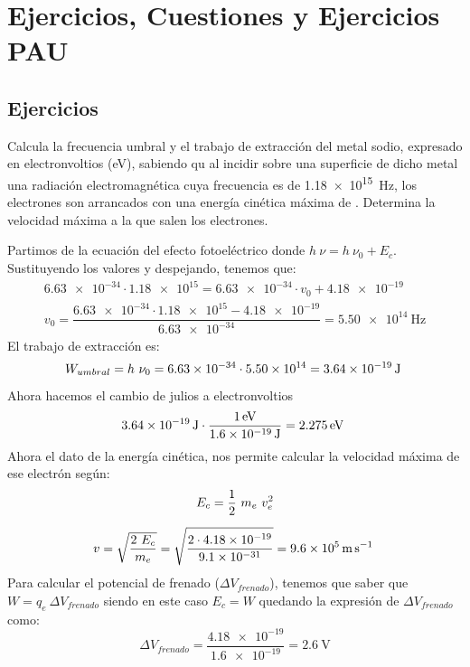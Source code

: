 

\section{Ejercicios, Cuestiones y Ejercicios PAU}

\subsection{Ejercicios}

\begin{exercise}
    Calcula la frecuencia umbral y el trabajo de extracción del metal sodio, expresado en electronvoltios (\unit{\electronvolt}), sabiendo qu al incidir sobre una superficie de dicho metal una radiación electromagnética cuya frecuencia es de \SI{1.18e15}{\hertz}, los electrones son arrancados con una energía cinética máxima de .
    Determina la velocidad máxima a la que salen los electrones.

    \begin{solu}
        Partimos de la ecuación del efecto fotoeléctrico donde \(h\ \nu = h\ \nu_0 + E_{c}\).
        Sustituyendo los valores y despejando, tenemos que:
        \begin{gather*}
            \num{6.63e-34}\cdot \num{1.18e15} = \num{6.63e-34}\cdot v_0 + \num{4.18e-19}\\
            v_0 = \dfrac{\num{6.63e-34}\cdot \num{1.18e15} - \num{4.18e-19}}{\num{6.63e-34}} = \SI{5.50e14}{\hertz}
        \end{gather*}
        El trabajo de extracción es:
        \begin{equation*}
            W_{umbral} = h\ \nu_0 =  \num{6.63e-34}\cdot \num{5.50e14} = \energia[j]{3.64e-19}
        \end{equation*}
        Ahora hacemos el cambio de julios a electronvoltios
        \begin{equation*}
            \SI{3.64e-19}{\joule}\cdot \dfrac{\SI{1}{\electronvolt}}{\SI{1.6e-19}{\joule}} = \energia[ev]{2.275}
        \end{equation*}
        Ahora el dato de la energía cinética, nos permite calcular la velocidad máxima de ese electrón según:
        \begin{gather*}
            E_c = \dfrac{1}{2}\ m_e \ v_e^2\separ
            v= \sqrt{\dfrac{2\ E_c}{m_e}} = \sqrt{\dfrac{2\cdot \num{4.18e-19}}{\num{9.1e-31}}} = \velocidad[ms]{9.6e5}
        \end{gather*}
        Para calcular el potencial de frenado (\(\Delta V_{frenado}\)), tenemos que saber que \(W = q_e \ \Delta V_{frenado}\) siendo en este caso \(E_c = W\) quedando la expresión de \(\Delta V_{frenado}\) como:
        \begin{equation*}
            \Delta V_{frenado} = \dfrac{\num{4.18e-19}}{\num{1.6e-19}} = \SI{2.6}{\volt}
        \end{equation*}
    \end{solu}
\end{exercise}

